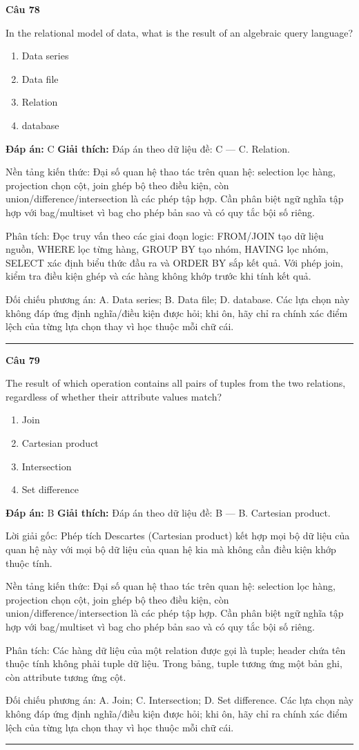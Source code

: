 \documentclass[11pt,a4paper]{article}
\newenvironment{question}[1]{%
  \par\vspace{1em}\noindent\textbf{\large Câu #1}\par\vspace{0.4em}
}{%
  \par\vspace{1em}\hrule\vspace{0.6em}
}
\newenvironment{choices}{%
  \begin{enumerate}[label=\textbf{\Alph*.},leftmargin=2.2em,itemsep=2pt,topsep=3pt]
}{%
  \end{enumerate}
}
\newcommand{\choice}{\item}
\begin{document}
\begin{question}{78}
In the relational model of data, what is the result of an algebraic query language?
\begin{choices}
\choice Data series
\choice Data file
\choice Relation
\choice database
\end{choices}
\textbf{Đáp án:} C
\textbf{Giải thích:} Đáp án theo dữ liệu đề: C — C. Relation.

Nền tảng kiến thức: Đại số quan hệ thao tác trên quan hệ: selection lọc hàng, projection chọn cột, join ghép bộ theo điều kiện, còn union/difference/intersection là các phép tập hợp. Cần phân biệt ngữ nghĩa tập hợp với bag/multiset vì bag cho phép bản sao và có quy tắc bội số riêng.

Phân tích: Đọc truy vấn theo các giai đoạn logic: FROM/JOIN tạo dữ liệu nguồn, WHERE lọc từng hàng, GROUP BY tạo nhóm, HAVING lọc nhóm, SELECT xác định biểu thức đầu ra và ORDER BY sắp kết quả. Với phép join, kiểm tra điều kiện ghép và các hàng không khớp trước khi tính kết quả.

Đối chiếu phương án: A. Data series; B. Data file; D. database. Các lựa chọn này không đáp ứng định nghĩa/điều kiện được hỏi; khi ôn, hãy chỉ ra chính xác điểm lệch của từng lựa chọn thay vì học thuộc mỗi chữ cái.
\end{question}

\begin{question}{79}
The result of which operation contains all pairs of tuples from the two relations, regardless of whether their attribute values match?
\begin{choices}
\choice Join
\choice Cartesian product
\choice Intersection
\choice Set difference
\end{choices}
\textbf{Đáp án:} B
\textbf{Giải thích:} Đáp án theo dữ liệu đề: B — B. Cartesian product.

Lời giải gốc: Phép tích Descartes (Cartesian product) kết hợp mọi bộ dữ liệu của quan hệ này với mọi bộ dữ liệu của quan hệ kia mà không cần điều kiện khớp thuộc tính.

Nền tảng kiến thức: Đại số quan hệ thao tác trên quan hệ: selection lọc hàng, projection chọn cột, join ghép bộ theo điều kiện, còn union/difference/intersection là các phép tập hợp. Cần phân biệt ngữ nghĩa tập hợp với bag/multiset vì bag cho phép bản sao và có quy tắc bội số riêng.

Phân tích: Các hàng dữ liệu của một relation được gọi là tuple; header chứa tên thuộc tính không phải tuple dữ liệu. Trong bảng, tuple tương ứng một bản ghi, còn attribute tương ứng cột.

Đối chiếu phương án: A. Join; C. Intersection; D. Set difference. Các lựa chọn này không đáp ứng định nghĩa/điều kiện được hỏi; khi ôn, hãy chỉ ra chính xác điểm lệch của từng lựa chọn thay vì học thuộc mỗi chữ cái.
\end{question}
\end{document}
